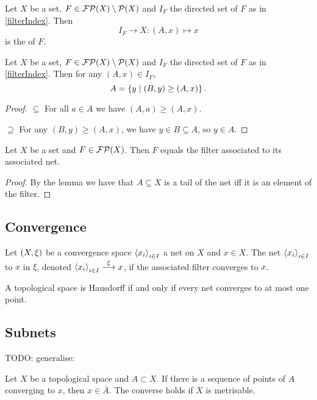 \begin{definition}
Let $X$ be a set, $F\in\operatorname{\mathcal{FP}}(X)\setminus\operatorname{\mathcal{P}}(X)$ and $I_F$ the directed set of $F$ as in \ref{filterIndex}. Then
\[ I_F \to X: (A,x) \mapsto x \]
is the  of $F$.
\end{definition}

\begin{lemma} \label{tailsFilterIndex}
Let $X$ be a set, $F\in\operatorname{\mathcal{FP}}(X)\setminus\operatorname{\mathcal{P}}(X)$ and $I_F$ the directed set of $F$ as in \ref{filterIndex}. Then for any $(A,x)\in I_F$,
\[ A = \left\{ y \;\middle|\; (B,y) \geq (A,x) \right\}. \]
\end{lemma}
\begin{proof}
$\boxed{\subseteq}$ For all $a\in A$ we have $(A,a)\geq (A,x)$.

$\boxed{\supseteq}$ For any $(B,y) \geq (A,x)$, we have $y\in B\subseteq A$, so $y\in A$.
\end{proof}
\begin{corollary}
Let $X$ be a set and $F\in\operatorname{\mathcal{FP}}(X)$. Then $F$ equals the filter associated to its associated net.
\end{corollary}
\begin{proof}
By the lemma we have that $A\subseteq X$ is a tail of the net iff it is an element of the filter.
\end{proof}

\subsection{Convergence}
\begin{definition}
Let $\left( X,\xi \right)$ be a convergence space $\left\langle x_i \right\rangle_{i\in I}$ a net on $X$ and $x\in X$. The net $\left\langle x_i \right\rangle_{i\in I}$  to $x$ in $\xi$, denoted $\left\langle x_i \right\rangle_{i\in I} \overset{\xi}{\longrightarrow} x$, if the associated filter converges to $x$.
\end{definition}

\begin{proposition}
A topological space is Hausdorff \textup{if and only if} every net converges to at most one point.
\end{proposition}

\subsection{Subnets}

TODO: generalise:
\begin{proposition}
Let $X$ be a topological space and $A\subset X$. If there is a sequence of points of $A$ converging to $x$, then $x\in\bar{A}$. The converse holds if $X$ is metrisable.
\end{proposition}



